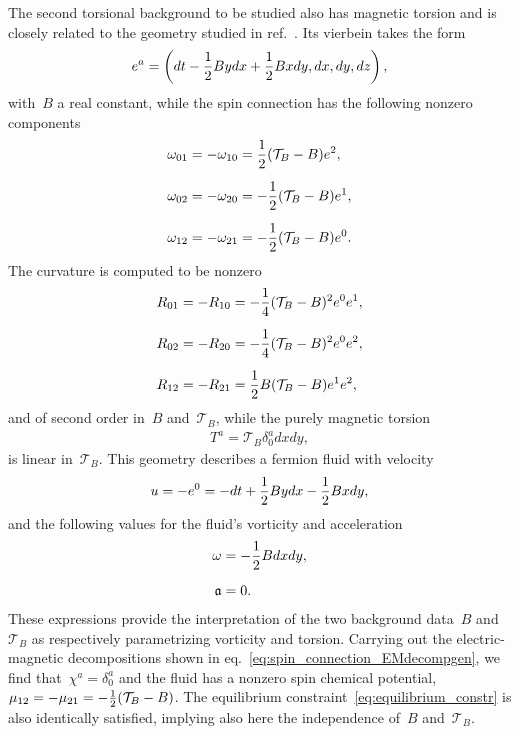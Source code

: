 \documentclass[11pt,a4paper]{article}
\begin{document}
The second torsional background to be studied also has magnetic torsion
and is closely related to the geometry
studied in ref.~\cite{Khaidukov:2018oat}.
Its vierbein takes the form
\begin{align}
e^{a}=\left(dt-{1\over 2}Bydx+{1\over 2}Bxdy,dx,dy,dz\right),
\label{eq:vckzgen}
\end{align}
with~$B$ a real constant, while the spin connection has the following nonzero components
\begin{align}
\omega_{01}&=-\omega_{10}={1\over 2}(\mathcal{T}_{B}-B)e^{2}, \nonumber \\[0.2cm]
\omega_{02}&=-\omega_{20}=-{1\over 2}(\mathcal{T}_{B}-B)e^{1}, \label{eq:sckzgen}\\[0.2cm]
\omega_{12}&=-\omega_{21}=-{1\over 2}(\mathcal{T}_{B}-B)e^{0}. \nonumber 
\end{align}
The curvature is computed to be nonzero
\begin{align}
R_{01}&=-R_{10}=-{1\over 4}(\mathcal{T}_{B}-B)^{2}e^{0}e^{1}, \nonumber \\[0.2cm]
R_{02}&=-R_{20}=-{1\over 4}(\mathcal{T}_{B}-B)^{2}e^{0}e^{2}, \\[0.2cm]
R_{12}&=-R_{21}={1\over 2}B(\mathcal{T}_{B}-B)e^{1}e^{2},
\nonumber
\end{align}
and of second order in~$B$ and~$\mathcal{T}_{B}$, while the purely magnetic torsion
\begin{align}
T^{a}=\mathcal{T}_{B}\delta^{a}_{0}dxdy,
\label{eq:kzgen_magtorsion}
\end{align}
is linear in~$\mathcal{T}_{B}$. 
This geometry describes a fermion fluid with velocity
\begin{align}
u=-e^{0}=-dt+{1\over 2}Bydx-{1\over 2}Bxdy,
\label{eq:velocity_oneform_BTB}
\end{align} 
and the following values for the fluid's vorticity and acceleration
\begin{align}
\omega&=-{1\over 2}Bdxdy, \nonumber \\[0.2cm]
\mathfrak{a}&=0.
\end{align}
These expressions provide the interpretation of the 
two background data~$B$ and~$\mathcal{T}_{B}$ as respectively parametrizing vorticity and torsion.  
Carrying out the electric-magnetic decompositions shown in eq.~\eqref{eq:spin_connection_EMdecompgen},
we find that~$\chi^{a}=\delta^{a}_{0}$ and the fluid has a nonzero spin chemical
potential,~$\mu_{12}=-\mu_{21}=-{1\over 2}(\mathcal{T}_{B}-B)$.
The equilibrium constraint~\eqref{eq:equilibrium_constr} 
is also identically satisfied,
implying also here the independence of~$B$ and~$\mathcal{T}_{B}$.
\end{document}
